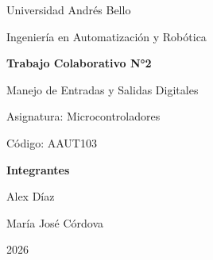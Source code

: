 \documentclass[12pt,a4paper]{article}
\begin{document}


\begin{titlepage}

    \centering

    {\Large Universidad Andrés Bello\par}

    \vspace{1.5cm}

    {\Large Ingeniería en Automatización y Robótica\par}

    \vspace{2cm}

    {\Huge\textbf{Trabajo Colaborativo N°2}\par}

    \vspace{0.5cm}

    {\LARGE Manejo de Entradas y Salidas Digitales\par}

    \vspace{2cm}

    {\large Asignatura: Microcontroladores\par}

    \vspace{0.4cm}

    {\large Código: AAUT103\par}

    \vfill

    {\large\textbf{Integrantes}\par}

    \vspace{0.5cm}

    {\large Alex Díaz\par}

    \vspace{0.2cm}

    {\large María José Córdova\par}

    \vfill

    {\large 2026\par}

\end{titlepage}

\end{document}
